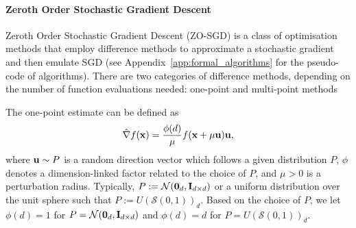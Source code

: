 
\paragraph{Zeroth Order Stochastic Gradient Descent}
Zeroth Order Stochastic Gradient Descent (ZO-SGD) is a class of optimisation methods that employ difference methods to approximate a stochastic gradient and then emulate SGD (see Appendix~\ref{app:formal_algorithms} for the pseudo-code of algorithms). There are two categories of difference methods, depending on the number of function evaluations needed: one-point and multi-point methods \cite{liu2018zerothorder}

The one-point estimate can be defined as
\begin{equation}
    \hat{\nabla} f(\bold{x}) = \frac{\phi(d)}{\mu}f(\bold{x}+\mu \bold{u})\bold{u},
\end{equation}
where $\bold{u} \sim P$ is a random direction vector which follows a given distribution $P$, $\phi$ denotes a dimension-linked factor related to the choice of $P$, and $\mu>0$ is a perturbation radius. Typically, $P := \mathcal{N}(\bold{0}_d,\bold{I}_{d\times d})$ or a uniform distribution over the unit sphere such that $P := U(\mathcal{S}(0,1))_{d}$. Based on the choice of $P$, we let $\phi(d)=1$ for $P = \mathcal{N}(\bold{0}_d,\bold{I}_{d\times d})$ and $\phi(d)=d$ for $P = U(\mathcal{S}(0,1))_{d}$.


